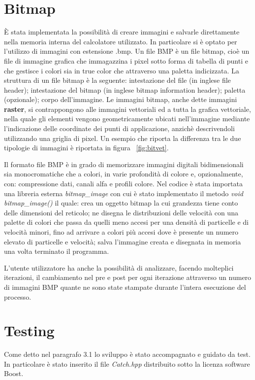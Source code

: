 {\section{Bitmap}
\`E stata implementata la possibilit\`a di creare immagini e salvarle direttamente nella memoria interna del calcolatore utilizzato. In particolare si \`e optato per l'utilizzo di immagini con estensione .bmp. Un file BMP è un file bitmap, cio\`e un file di immagine grafica che immagazzina i pixel sotto forma di tabella di punti e che gestisce i colori sia in true color che attraverso una paletta indicizzata. La struttura di un file bitmap \`e la seguente: intestazione del file (in inglese file header); intestazione del bitmap (in inglese bitmap information header); paletta (opzionale); corpo dell'immagine.
Le immagini bitmap, anche dette immagini \textbf{raster}, si contrappongono alle immagini vettoriali ed a tutta la grafica vettoriale, nella quale gli elementi vengono geometricamente ubicati nell'immagine mediante l'indicazione delle coordinate dei punti di applicazione, anzich\`e descrivendoli utilizzando una griglia di pixel. Un esempio che riporta la differenza tra le due tipologie di immagini \`e riportata in figura \figurename~\ref{fig:bitvet}.

Il formato file BMP \`e in grado di memorizzare immagini digitali bidimensionali sia monocromatiche che a colori, in varie profondit\`a di colore e, opzionalmente, con: compressione dati, canali alfa e profili colore. Nel codice \`e stata importata una libreria esterna \textit{bitmap\_image} con cui \`e stato implementato il metodo \textit{void bitmap\_image()} il quale: crea un oggetto bitmap la cui grandezza tiene conto delle dimensioni del reticolo; ne disegna le distribuzioni delle velocit\`a con una palette di colori che passa da quelli meno accesi per una densit\`a di particelle e di velocit\`a minori, fino ad arrivare a colori pi\`u accesi dove \`e presente un numero elevato di particelle e velocit\`a; salva l'immagine creata e disegnata in memoria una volta terminato il programma. 

L'utente utilizzatore ha anche la possibilit\`a di analizzare, facendo molteplici iterazioni, il cambiamento nel pre e post per ogni iterazione attraverso un numero di immagini BMP quante ne sono state stampate durante l'intera esecuzione del processo.

\section{Testing}
Come detto nel paragrafo 3.1 lo sviluppo \`e stato accompagnato e guidato da test. In particolare \`e stato inserito il file \textit{Catch.hpp} distribuito sotto la licenza software Boost.

}
